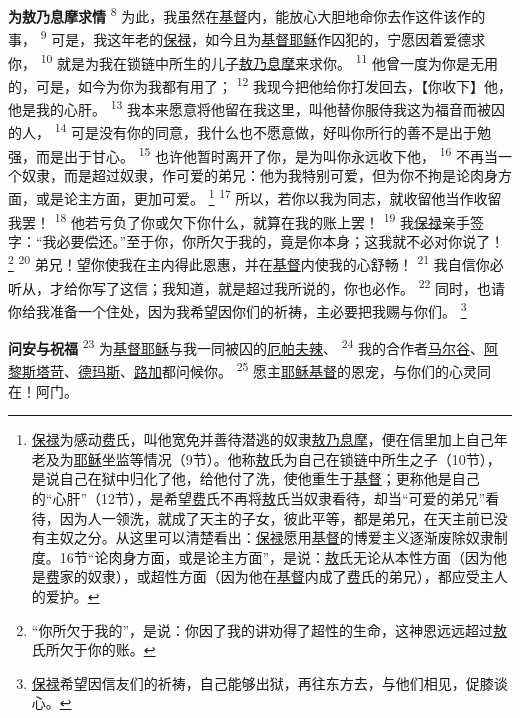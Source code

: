 \begin{multicols}{2}
\textbf{为敖乃息摩求情\quad}
\textsuperscript{8}
为此，我虽然在\uline{基督}内，能放心大胆地命你去作这件该作的事，
\textsuperscript{9}
可是，我这年老的\uline{保禄}，如今且为\uline{基督}\uline{耶稣}作囚犯的，宁愿因着爱德求你，
\textsuperscript{10}
就是为我在锁链中所生的儿子\uline{敖乃息摩}来求你。
\textsuperscript{11}
他曾一度为你是无用的，可是，如今为你为我都有用了；
\textsuperscript{12}
我现今把他给你打发回去，【你收下】他，他是我的心肝。
\textsuperscript{13}
我本来愿意将他留在我这里，叫他替你服侍我这为福音而被囚的人，
\textsuperscript{14}
可是没有你的同意，我什么也不愿意做，好叫你所行的善不是出于勉强，而是出于甘心。
\textsuperscript{15}
也许他暂时离开了你，是为叫你永远收下他，
\textsuperscript{16}
不再当一个奴隶，而是超过奴隶，作可爱的弟兄：他为我特别可爱，但为你不拘是论肉身方面，或是论主方面，更加可爱。
\footnote{\uline{保禄}为感动\uline{费}氏，叫他宽免并善待潜逃的奴隶\uline{敖乃息摩}，便在信里加上自己年老及为\uline{耶稣}坐监等情况（9节）。他称\uline{敖}氏为自己在锁链中所生之子（10节），是说自己在狱中归化了他，给他付了洗，使他重生于\uline{基督}；更称他是自己的“心肝”（12节），是希望\uline{费}氏不再将\uline{敖}氏当奴隶看待，却当“可爱的弟兄”看待，因为人一领洗，就成了天主的子女，彼此平等，都是弟兄，在天主前已没有主奴之分。从这里可以清楚看出：\uline{保禄}愿用\uline{基督}的博爱主义逐渐废除奴隶制度。16节“论肉身方面，或是论主方面”，是说：\uline{敖}氏无论从本性方面（因为他是\uline{费}家的奴隶），或超性方面（因为他在\uline{基督}内成了\uline{费}氏的弟兄），都应受主人的爱护。}
\textsuperscript{17}
所以，若你以我为同志，就收留他当作收留我罢！
\textsuperscript{18}
他若亏负了你或欠下你什么，就算在我的账上罢！
\textsuperscript{19}
我\uline{保禄}亲手签字：“我必要偿还。”至于你，你所欠于我的，竟是你本身；这我就不必对你说了！
\footnote{“你所欠于我的”，是说：你因了我的讲劝得了超性的生命，这神恩远远超过\uline{敖}氏所欠于你的账。}
\textsuperscript{20}
弟兄！望你使我在主内得此恩惠，并在\uline{基督}内使我的心舒畅！
\textsuperscript{21}
我自信你必听从，才给你写了这信；我知道，就是超过我所说的，你也必作。
\textsuperscript{22}
同时，也请你给我准备一个住处，因为我希望因你们的祈祷，主必要把我赐与你们。
\footnote{\uline{保禄}希望因信友们的祈祷，自己能够出狱，再往东方去，与他们相见，促膝谈心。}

\textbf{问安与祝福\quad}
\textsuperscript{23}
为\uline{基督}\uline{耶稣}与我一同被囚的\uline{厄帕夫辣}、
\textsuperscript{24}
我的合作者\uline{马尔谷}、\uline{阿黎斯塔苛}、\uline{德玛斯}、\uline{路加}都问候你。
\textsuperscript{25}
愿主\uline{耶稣}\uline{基督}的恩宠，与你们的心灵同在！阿门。
\end{multicols}